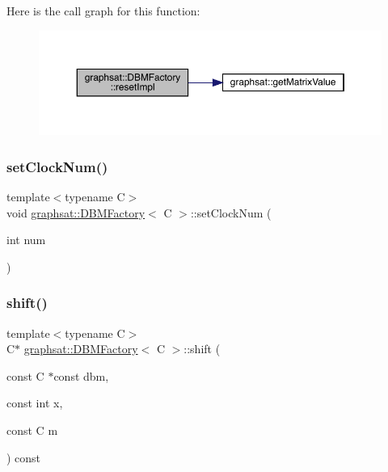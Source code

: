 Here is the call graph for this function\+:
\nopagebreak
\begin{figure}[H]
\begin{center}
\leavevmode
\includegraphics[width=350pt]{classgraphsat_1_1_d_b_m_factory_a2b760cdec73147a8bb44d043b349074b_cgraph}
\end{center}
\end{figure}
\mbox{\label{classgraphsat_1_1_d_b_m_factory_ab3c0c83274b0cda4d0899e529ada4138}} 
\subsubsection{\texorpdfstring{setClockNum()}{setClockNum()}}
{\footnotesize\ttfamily template$<$typename C$>$ \\
void \mbox{\hyperlink{classgraphsat_1_1_d_b_m_factory}{graphsat\+::\+D\+B\+M\+Factory}}$<$ C $>$\+::set\+Clock\+Num (\begin{DoxyParamCaption}\item[{int}]{num }\end{DoxyParamCaption})\hspace{0.3cm}{\ttfamily [inline]}}

\mbox{\label{classgraphsat_1_1_d_b_m_factory_a2d0b5e437a030cf28fca6f291ed1b1f6}} 
\subsubsection{\texorpdfstring{shift()}{shift()}}
{\footnotesize\ttfamily template$<$typename C$>$ \\
C$\ast$ \mbox{\hyperlink{classgraphsat_1_1_d_b_m_factory}{graphsat\+::\+D\+B\+M\+Factory}}$<$ C $>$\+::shift (\begin{DoxyParamCaption}\item[{const C $\ast$const}]{dbm,  }\item[{const int}]{x,  }\item[{const C}]{m }\end{DoxyParamCaption}) const\hspace{0.3cm}{\ttfamily [inline]}}




